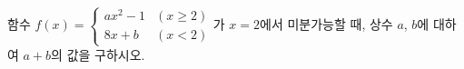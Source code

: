 함수 $f(x)=\begin{cases} ax^2-1 & (x\ge 2) \\ 8x+b & (x<2) \end{cases}$가 $x=2$에서 미분가능할 때, 상수 $a$, $b$에 대하여 $a+b$의 값을 구하시오.
